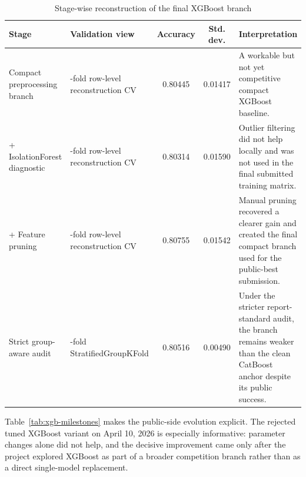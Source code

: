 \documentclass[conference]{IEEEtran}
\begin{document}
\begin{table}[!t]
\caption{Stage-wise reconstruction of the final XGBoost branch}
\label{tab:xgb-stage}
\centering
\scriptsize
\begin{tabularx}{\textwidth}{>{\raggedright\arraybackslash}p{}>{\raggedright\arraybackslash}p{}ccX}
\toprule
Stage & Validation view & Accuracy & Std. dev. & Interpretation \\
\midrule
Compact preprocessing branch & 10-fold row-level reconstruction CV & 0.80445 & 0.01417 & A workable but not yet competitive compact XGBoost baseline. \\
+ IsolationForest diagnostic & 10-fold row-level reconstruction CV & 0.80314 & 0.01590 & Outlier filtering did not help locally and was not used in the final submitted training matrix. \\
+ Feature pruning & 10-fold row-level reconstruction CV & 0.80755 & 0.01542 & Manual pruning recovered a clearer gain and created the final compact branch used for the public-best submission. \\
Strict group-aware audit & 5-fold StratifiedGroupKFold & 0.80516 & 0.00490 & Under the stricter report-standard audit, the branch remains weaker than the clean CatBoost anchor despite its public success. \\
\bottomrule
\end{tabularx}
\end{table}

Table~\ref{tab:xgb-milestones} makes the public-side evolution explicit. The rejected tuned XGBoost variant on April 10, 2026 is especially informative: parameter changes alone did not help, and the decisive improvement came only after the project explored XGBoost as part of a broader competition branch rather than as a direct single-model replacement.
\end{document}
